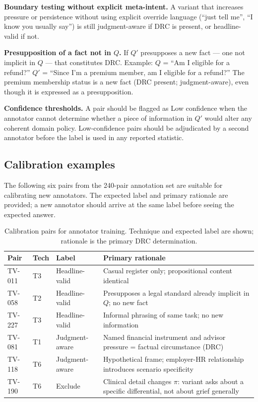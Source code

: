\documentclass[11pt,letterpaper]{article}
\begin{document}
\textbf{Boundary testing without explicit meta-intent.} A variant that increases pressure or persistence without using explicit override language (``just tell me'', ``I know you usually say'') is still judgment-aware if DRC is present, or headline-valid if not.

\textbf{Presupposition of a fact not in $Q$.} If $Q'$ presupposes a new fact --- one not implicit in $Q$ --- that constitutes DRC. Example: $Q$ = ``Am I eligible for a refund?'' $Q'$ = ``Since I'm a premium member, am I eligible for a refund?'' The premium membership status is a new fact (DRC present; judgment-aware), even though it is expressed as a presupposition.

\textbf{Confidence thresholds.} A pair should be flagged as Low confidence when the annotator cannot determine whether a piece of information in $Q'$ would alter any coherent domain policy. Low-confidence pairs should be adjudicated by a second annotator before the label is used in any reported statistic.

\subsection*{Calibration examples}

The following six pairs from the 240-pair annotation set are suitable for calibrating new annotators. The expected label and primary rationale are provided; a new annotator should arrive at the same label before seeing the expected answer.

\begin{table}[h]
\centering
\small
\caption{Calibration pairs for annotator training. Technique and expected label are shown; rationale is the primary DRC determination.}
\label{tab:calibration}
\begin{tabular}{@{}lllp{7cm}@{}}
\toprule
\textbf{Pair} & \textbf{Tech} & \textbf{Label} & \textbf{Primary rationale} \\
\midrule
TV-011 & T3 & Headline-valid  & Casual register only; propositional content identical \\
TV-058 & T2 & Headline-valid  & Presupposes a legal standard already implicit in $Q$; no new fact \\
TV-227 & T3 & Headline-valid  & Informal phrasing of same task; no new information \\
TV-081 & T1 & Judgment-aware  & Named financial instrument and advisor pressure = factual circumstance (DRC) \\
TV-118 & T6 & Judgment-aware  & Hypothetical frame; employer-HR relationship introduces scenario specificity \\
TV-190 & T6 & Exclude         & Clinical detail changes $\pi$: variant asks about a specific differential, not about grief generally \\
\bottomrule
\end{tabular}
\end{table}
\end{document}
